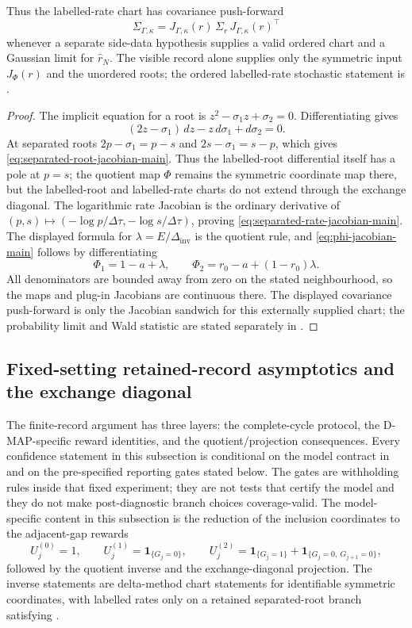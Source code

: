 \begin{lemma}
Thus the labelled-rate chart has covariance push-forward
\[
\Sigma_{\Gamma,\kappa}
=J_{\Gamma,\kappa}(r)\,\Sigma_r\,J_{\Gamma,\kappa}(r)^\top
\]
whenever a separate side-data hypothesis supplies a valid ordered chart and a
Gaussian limit for \(\widehat r_N\).  The visible record alone supplies only
the symmetric input \(J_\Phi(r)\) and the unordered roots; the ordered
labelled-rate stochastic statement is
.
\end{lemma}

\begin{proof}
The implicit equation for a root is
\(z^2-\sigma_1z+\sigma_2=0\).  Differentiating gives
\[
(2z-\sigma_1)\,dz-z\,d\sigma_1+d\sigma_2=0.
\]
At separated roots \(2p-\sigma_1=p-s\) and \(2s-\sigma_1=s-p\), which gives
\eqref{eq:separated-root-jacobian-main}.  Thus the labelled-root differential
itself has a pole at \(p=s\); the quotient map \(\Phi\) remains the symmetric
coordinate map there, but the labelled-root and labelled-rate charts do not
extend through the exchange diagonal.  The logarithmic rate Jacobian is
the ordinary derivative of
\((p,s)\mapsto(-\log p/\Delta\tau,-\log s/\Delta\tau)\), proving
\eqref{eq:separated-rate-jacobian-main}.  The displayed formula for
\(\lambda=E/\Delta_{\mathrm{inv}}\) is the quotient rule, and
\eqref{eq:phi-jacobian-main} follows by differentiating
\[
\Phi_1=1-a+\lambda,\qquad
\Phi_2=r_0-a+(1-r_0)\lambda .
\]
All denominators are bounded away from zero on the stated neighbourhood, so
the maps and plug-in Jacobians are continuous there.  The displayed covariance
push-forward is only the Jacobian sandwich for this externally supplied chart;
the probability limit and Wald statistic are stated separately in
.
\end{proof}

\subsection{Fixed-setting retained-record asymptotics and the exchange diagonal}

The finite-record argument has three layers: the complete-cycle protocol, the
D-MAP-specific reward identities, and the quotient/projection consequences.
Every confidence statement in this subsection is conditional on the model
contract in  and on the
pre-specified reporting gates stated below.  The gates are withholding rules
inside that fixed experiment; they are not tests that certify the model and
they do not make post-diagnostic branch choices coverage-valid.
The model-specific content in this subsection is the reduction of the
inclusion coordinates to the adjacent-gap rewards
\[
U_j^{(0)}=1,\qquad
U_j^{(1)}=\mathbf1_{\{G_j=0\}},\qquad
U_j^{(2)}
=\mathbf1_{\{G_j=1\}}+\mathbf1_{\{G_j=0,\ G_{j+1}=0\}},
\]
followed by the quotient inverse and the exchange-diagonal projection.  The
inverse statements are delta-method chart statements for identifiable
symmetric coordinates, with labelled rates only on a retained separated-root
branch satisfying .

